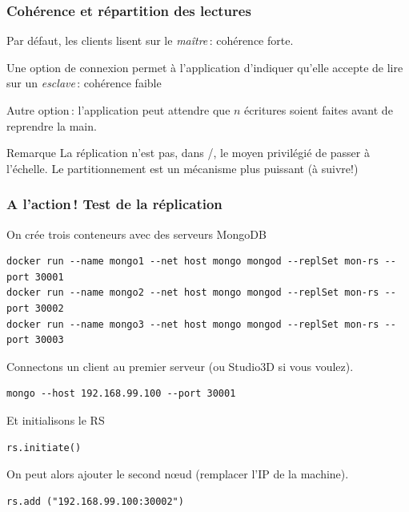 \begin{frame}
\frametitle{Cohérence et répartition des lectures}

Par défaut, les clients lisent sur le \textit{maître}\,: \alert{cohérence forte}.

\vfill

Une option de connexion permet à l'application d'indiquer qu'elle accepte de lire sur un \textit{esclave}\,:
   \alert{cohérence faible}
   
\vfill
   
Autre option\,: l'application peut attendre que $n$ écritures soient faites avant de reprendre la main.

\begin{remblock}{Remarque}
La réplication n'est pas, dans \mongodb/, le moyen privilégié de passer à l'échelle. Le \alert{partitionnement}
est un mécanisme plus puissant (à suivre!)
\end{remblock}

\end{frame}


\begin{frame}[fragile]
\frametitle{A l'action\,! Test de la réplication}

On crée trois conteneurs avec des serveurs MongoDB

\begin{verbatim}
docker run --name mongo1 --net host mongo mongod --replSet mon-rs --port 30001
docker run --name mongo2 --net host mongo mongod --replSet mon-rs --port 30002
docker run --name mongo3 --net host mongo mongod --replSet mon-rs --port 30003
\end{verbatim}
\vfill

Connectons un client au premier serveur (ou Studio3D si vous voulez).


\begin{verbatim}
mongo --host 192.168.99.100 --port 30001
\end{verbatim}

Et initialisons le RS 

\begin{verbatim}
rs.initiate()
\end{verbatim}

On peut alors ajouter le second n{\oe}ud (remplacer l'IP de la machine).

\begin{verbatim}
rs.add ("192.168.99.100:30002")
\end{verbatim}


\end{frame}

